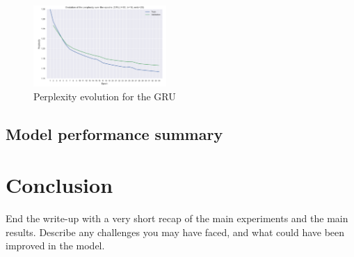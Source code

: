 \documentclass[11pt]{article}
\begin{document}
\begin{figure}[H]
\begin{center}
    \includegraphics[width=0.45\textwidth]{perp_gru.png}
    \caption{Perplexity evolution for the GRU}
\end{center}
\end{figure}


\subsection{Model performance summary}


\section{Conclusion}

End the write-up with a very short recap of the main experiments and the main results. Describe any challenges you may have faced, and what could have been improved in the model.



\end{document}
